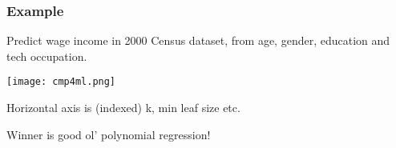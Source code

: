 \documentclass{beamer}
\begin{document}
\begin{frame} 
\frametitle{Example}

Predict wage income in 2000 Census dataset, from age, gender, education and
tech occupation.

\texttt{[image: cmp4ml.png]}

Horizontal axis is (indexed) k, min leaf size etc.

Winner is good ol' polynomial regression!

\end{frame} 
\end{document}
